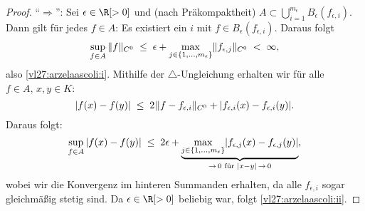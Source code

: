 \begin{proof}
    \enquote{$\Rightarrow$}: Sei $\epsilon\in\R[>0]$ und (nach Präkompaktheit)
    $A\subset\bigcup_{i=1}^{m_\epsilon} B_\epsilon(f_{\epsilon,i})$.
    Dann gilt für jedes $f\in A$: Es existiert ein $i$ mit $f\in
    B_\epsilon(f_{\epsilon,i})$. Daraus folgt
    \[ \thickmuskip=10mu
        \sup_{f\in A}\, \norm{f}_{C^0} \leq \epsilon
        + \max_{j\in\{1,\dots,m_\epsilon\}} \norm{f_{\epsilon,j}}_{C^0} <
        \infty
    , \]
    also \ref{vl27:arzelaascoli:i}. Mithilfe der $\triangle$-Ungleichung
    erhalten wir für alle
    $f\in A,\,x,y\in K$:
    \[ \thickmuskip=10mu
        \abs{f(x)-f(y)} \leq 2\mkern1mu\norm{f-f_{\epsilon,i}}_{C^0}
        + \abs{f_{\epsilon,i}(x)-f_{\epsilon,i}(y)}
    . \]
    Daraus folgt:
    \[ \thickmuskip=10mu
        \sup_{f\in A}\, \abs{f(x)-f(y)} \leq 2\epsilon
        + \underbrace{ \max_{j\in\{1,\dots,m_\epsilon\}}
        \abs{f_{\epsilon,j}(x)-f_{\epsilon,j}(y)} }_{
            \to\,0\text{ für } \abs{x-y}\,\to\,0}
    , \]
    wobei wir die Konvergenz im hinteren Summanden erhalten, da alle
    $f_{\epsilon,i}$ sogar gleichmäßig stetig sind. Da $\epsilon\in\R[>0]$
    beliebig war, folgt \ref{vl27:arzelaascoli:ii}.
    

\end{proof}
